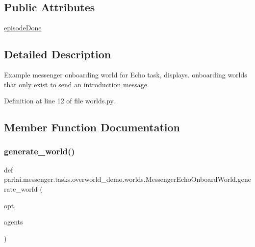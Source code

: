 \subsection*{Public Attributes}
\begin{DoxyCompactItemize}
\item 
\hyperlink{classparlai_1_1messenger_1_1tasks_1_1overworld__demo_1_1worlds_1_1MessengerEchoOnboardWorld_a10d42d6a9a4957c1505481b7853ad1de}{episode\+Done}
\end{DoxyCompactItemize}


\subsection{Detailed Description}
\begin{DoxyVerb}Example messenger onboarding world for Echo task, displays.
onboarding worlds that only exist to send an introduction message.
\end{DoxyVerb}
 

Definition at line 12 of file worlds.\+py.



\subsection{Member Function Documentation}
\mbox{\label{classparlai_1_1messenger_1_1tasks_1_1overworld__demo_1_1worlds_1_1MessengerEchoOnboardWorld_a97029bbeac8283a3d03b3ff82db11dae}} 
\subsubsection{\texorpdfstring{generate\+\_\+world()}{generate\_world()}}
{\footnotesize\ttfamily def parlai.\+messenger.\+tasks.\+overworld\+\_\+demo.\+worlds.\+Messenger\+Echo\+Onboard\+World.\+generate\+\_\+world (\begin{DoxyParamCaption}\item[{}]{opt,  }\item[{}]{agents }\end{DoxyParamCaption})\hspace{0.3cm}{\ttfamily [static]}}



